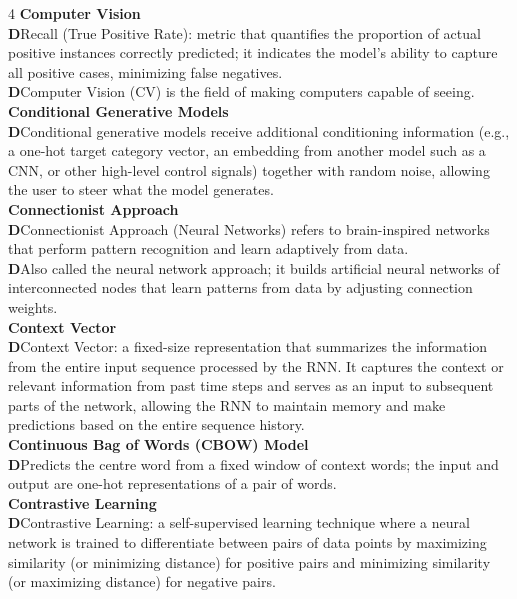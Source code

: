 \documentclass[8pt]{extarticle}
\newcommand{\dtag}{\textcolor{definitioncolor}{\tiny\textbf{D}}\;}
\begin{document}
\begin{multicols}{4}
\vspace{2pt}\textbf{Computer Vision}\\
\dtag Recall (True Positive Rate): metric that quantifies the proportion of actual positive instances correctly predicted; it indicates the model's ability to capture all positive cases, minimizing false negatives.\\
\dtag Computer Vision (CV) is the field of making computers capable of seeing.\\
\vspace{2pt}\textbf{Conditional Generative Models}\\
\dtag Conditional generative models receive additional conditioning information (e.g., a one-hot target category vector, an embedding from another model such as a CNN, or other high-level control signals) together with random noise, allowing the user to steer what the model generates.\\
\vspace{2pt}\textbf{Connectionist Approach}\\
\dtag Connectionist Approach (Neural Networks) refers to brain-inspired networks that perform pattern recognition and learn adaptively from data.\\
\dtag Also called the neural network approach; it builds artificial neural networks of interconnected nodes that learn patterns from data by adjusting connection weights.\\
\vspace{2pt}\textbf{Context Vector}\\
\dtag Context Vector: a fixed-size representation that summarizes the information from the entire input sequence processed by the RNN. It captures the context or relevant information from past time steps and serves as an input to subsequent parts of the network, allowing the RNN to maintain memory and make predictions based on the entire sequence history.\\
\vspace{2pt}\textbf{Continuous Bag of Words (CBOW) Model}\\
\dtag Predicts the centre word from a fixed window of context words; the input and output are one-hot representations of a pair of words.\\
\vspace{2pt}\textbf{Contrastive Learning}\\
\dtag Contrastive Learning: a self-supervised learning technique where a neural network is trained to differentiate between pairs of data points by maximizing similarity (or minimizing distance) for positive pairs and minimizing similarity (or maximizing distance) for negative pairs.\\

\end{multicols}
\end{document}
